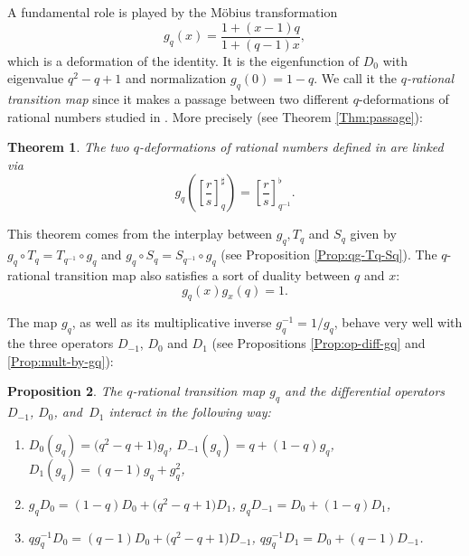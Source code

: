 \documentclass[10pt,a4paper]{amsart}
\numberwithin{equation}{section}
\newtheorem{Theorem}{Theorem}[section]
\newtheorem{Proposition}[Theorem]{Proposition}
 { \theoremstyle{definition}
\newtheorem{Definition}[Theorem]{Definition}
\newtheorem{Note}[Theorem]{Note}
\newtheorem{Example}[Theorem]{Example}
\newtheorem{Remark}[Theorem]{Remark} }
\begin{document}
A fundamental role is played by the M\"obius transformation
\[
g_q(x)=\frac{1+(x-1)q}{1+(q-1)x},
\]
which is a deformation of the identity. It is the eigenfunction of $D_0$ with eigenvalue $q^2-q+1$ and normalization $g_q(0)=1-q$.
We call it the \emph{$q$-rational transition map} since it makes a passage between two different $q$-deformations of rational numbers studied in \cite{bapat2023q}. More precisely (see Theorem \ref{Thm:passage}):
\begin{Theorem}
The two $q$-deformations of rational numbers defined in {\rm \cite[Definition 2.6]{bapat2023q}} are linked via
\[
g_q\left(\left[\frac{r}{s}\right]_q^\sharp\right)=\left[\frac{r}{s}\right]_{q^{-1}}^\flat.\]
\end{Theorem}

This theorem comes from the interplay between $g_q, T_q$ and $S_q$ given by $g_q\circ T_q=T_{q^{-1}}\circ g_q$ and $g_q\circ S_q=S_{q^{-1}}\circ g_q$ (see Proposition \ref{Prop:qg-Tq-Sq}). The $q$-rational transition map also satisfies a sort of duality between $q$ and $x$:
\[g_q(x)g_x(q)=1.
\]

The map $g_q$, as well as its multiplicative inverse $g_q^{-1}=1/g_q$, behave very well with the three operators $D_{-1}$, $D_0$ and $D_1$ (see Propositions \ref{Prop:op-diff-gq} and \ref{Prop:mult-by-gq}):

\begin{Proposition}
The $q$-rational transition map $g_q$ and the differential operators $D_{-1}$, $D_0$, and~$D_1$ interact in the following way:
\begin{enumerate}\itemsep=0pt
\item[$(1)$] $D_0(g_q) = \big(q^2-q+1\big)g_q$, $D_{-1}(g_q) = q+(1-q)g_q$, $D_1(g_q) = (q-1)g_q+g_q^2$,
\item[$(2)$] $g_qD_0 = (1-q)D_0+\big(q^2-q+1\big)D_1$, $g_qD_{-1}= D_0+(1-q)D_1$,
\item[$(3)$] $qg_q^{-1}D_0 = (q-1)D_0+\big(q^2-q+1\big)D_{-1}$, $qg_q^{-1}D_{1}= D_0+(q-1)D_{-1}$.
\end{enumerate}
\end{Proposition}
\end{document}
